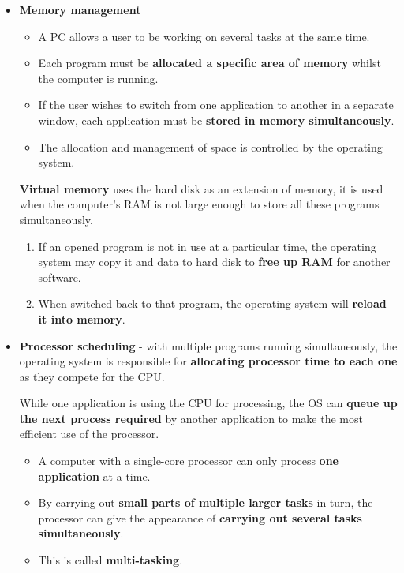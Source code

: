 \begin{itemize}
    \item \textbf{Memory management}
        \begin{itemize}
            \item A PC allows a user to be working on several tasks at the same time.
            \item Each program must be \textbf{allocated a specific area of memory} whilst the computer is running.
            \item If the user wishes to switch from one application to another in a separate window, each application must be \textbf{stored in memory simultaneously}.
            \item The allocation and management of space is controlled by the operating system.
        \end{itemize}

        \textbf{Virtual memory} uses the hard disk as an extension of memory, it is used when the computer's RAM is not large enough to store all these programs simultaneously.
        \begin{enumerate}
            \item If an opened program is not in use at a particular time, the operating system may copy it and data to hard disk to \textbf{free up RAM} for another software.
            \item When switched back to that program, the operating system will \textbf{reload it into memory}.
        \end{enumerate}

    \item \textbf{Processor scheduling} - with multiple programs running simultaneously, the operating system is responsible for \textbf{allocating processor time to each one} as they compete for the CPU.

            While one application is using the CPU for processing, the OS can \textbf{queue up the next process required} by another application to make the most efficient use of the processor.
        \begin{itemize}
            \item A computer with a single-core processor can only process \textbf{one application} at a time.
            \item By carrying out \textbf{small parts of multiple larger tasks} in turn, the processor can give the appearance of \textbf{carrying out several tasks simultaneously}.
            \item This is called \textbf{multi-tasking}.
        \end{itemize}


\end{itemize}
